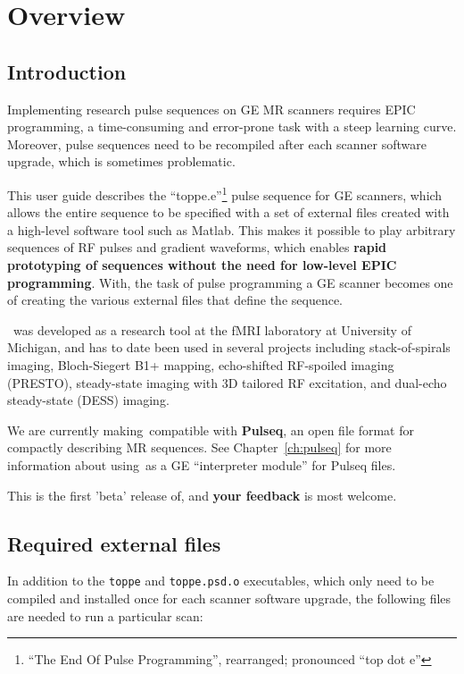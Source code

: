 

\chapter{Overview}
\setcounter{page}{1}

\section{Introduction}
Implementing research pulse sequences on GE MR scanners requires EPIC programming, a time-consuming and error-prone task with a steep learning curve.
Moreover, pulse sequences need to be recompiled after each scanner software upgrade, which is sometimes problematic.

This user guide describes the ``toppe.e''\footnote{``The End Of Pulse Programming'', rearranged; pronounced ``top dot e''} pulse sequence for GE scanners, which allows the entire sequence to be specified with a set of external files created with a high-level software tool such as Matlab.
This makes it possible to play arbitrary sequences of RF pulses and gradient waveforms, which enables \textbf{rapid prototyping of sequences without the need for low-level EPIC programming}.
With\toppe, the task of pulse programming a GE scanner becomes one of creating the various external files that define the sequence.

\toppe~was developed as a research tool at the fMRI laboratory at University of Michigan, and has to date been used in several projects including stack-of-spirals imaging, Bloch-Siegert B1+ mapping, echo-shifted RF-spoiled imaging (PRESTO), steady-state imaging with 3D tailored RF excitation, and dual-echo steady-state (DESS) imaging.

We are currently making\toppe~compatible with {\bf Pulseq}, an open file format for compactly describing MR sequences.
See Chapter~\ref{ch:pulseq} for more information about using\toppe~as a GE ``interpreter module'' for Pulseq files.

This is the first 'beta' release of\toppe, and \textbf{your feedback} is most welcome. 


\section{Required external files}
In addition to the {\tt toppe} and {\tt toppe.psd.o} executables, which only need to be compiled and installed once for each scanner software upgrade, the following files are needed to run a particular scan:

